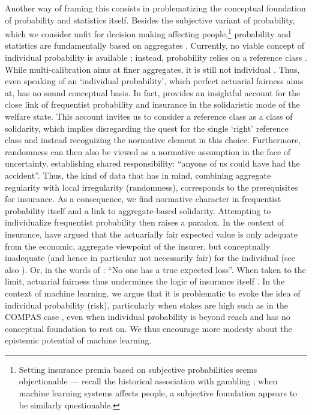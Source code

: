 \documentclass[11pt]{article} %
\begin{document}
Another way of framing this consists in problematizing the conceptual foundation of probability and statistics itself. Besides the subjective variant of probability, which we consider unfit for decision making affecting people,\footnote{Setting insurance premia based on subjective probabilities seems objectionable --- recall the historical association with gambling \citep{cooper2009probability}; when machine learning systems affects people, a subjective foundation appears to be similarly questionable.} probability and statistics are fundamentally based on aggregates \citep{desrosieres1998politics}. Currently, no viable concept of individual probability is available \citep{dawid2017individual}; instead, probability relies on a reference class \citep{Reichenbach1949-REITTO-3,hajek2007reference}. While multi-calibration aims at finer aggregates, it is still not individual \citep{dawid2017individual}. Thus, even speaking of an `individual probability', which perfect actuarial fairness aims at, has no sound conceptual basis. 
In fact, \citet[Chapter 4]{friedman2020probable} provides an insightful account for the close link of frequentist probability and insurance in the solidaristic mode of the welfare state. This account invites us to consider a reference class as a class of solidarity, which implies disregarding the quest for the single `right' reference class and instead recognizing the normative element in this choice. Furthermore, randomness can then also be viewed as a normative assumption in the face of uncertainty, establishing shared responsibility: ``anyone of us could have had the accident''. Thus, the kind of data that \citet{Venn1876} has in mind, combining aggregate regularity with local irregularity (randomness), corresponds to the prerequisites for insurance. As a consequence, we find normative character in frequentist probability itself and a link to aggregate-based solidarity.
Attempting to individualize frequentist probability then raises a paradox.
In the context of insurance, \citet{frezal2020fairness} have argued that the actuarially fair expected value is only adequate from the economic, aggregate viewpoint of the insurer, but conceptually inadequate (and hence in particular not necessarily fair) for the individual (see also \citep{frezal2016}). Or, in the words of \citet{abraham1985efficiency}: ``No one has a true expected loss''. When taken to the limit, actuarial fairness thus undermines the logic of insurance itself \citep{martinez2016fair}. In the context of machine learning, we argue that it is problematic to evoke the idea of individual probability (risk), particularly when stakes are high such as in the COMPAS case \citep{machinebias}, even when individual probability is beyond reach and has no conceptual foundation to rest on. We thus encourage more modesty about the epistemic potential of machine learning.
\end{document}
